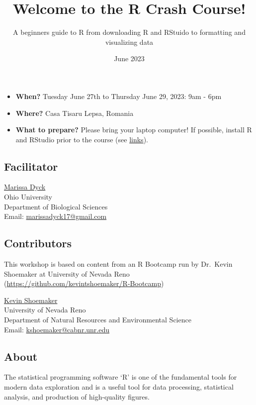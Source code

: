 \documentclass[
]{article}
\title{Welcome to the R Crash Course!}
\author{A beginners guide to R from downloading R and RStuido to
formatting and visualizing data}
\date{June 2023}
\providecommand{\tightlist}{%
  \setlength{\itemsep}{0pt}\setlength{\parskip}{0pt}}
\begin{document}
\maketitle

\begin{itemize}
\tightlist
\item
  \textbf{When?} Tuesday June 27th to Thursday June 29, 2023: 9am - 6pm
\item
  \textbf{Where?} Casa Tisaru Lepsa, Romania
\item
  \textbf{What to prepare?} Please bring your laptop computer! If
  possible, install R and RStudio prior to the course (see
  \href{Links.html}{links}).
\end{itemize}

\hypertarget{facilitator}{%
\subsection{Facilitator}\label{facilitator}}

\href{https://github.com/marissadyck}{Marissa Dyck}\\
Ohio University\\
Department of Biological Sciences\\
Email: \url{marissadyck17@gmail.com}

\hypertarget{contributors}{%
\subsection{Contributors}\label{contributors}}

This workshop is based on content from an R Bootcamp run by Dr.~Kevin
Shoemaker at University of Nevada Reno
(\url{https://github.com/kevintshoemaker/R-Bootcamp})

\href{http://naes.unr.edu/shoemaker/}{Kevin Shoemaker}\\
University of Nevada Reno\\
Department of Natural Resources and Environmental Science\\
Email: \url{kshoemaker@cabnr.unr.edu}

\hypertarget{about}{%
\subsection{About}\label{about}}

The statistical programming software `R' is one of the fundamental tools
for modern data exploration and is a useful tool for data processing,
statistical analysis, and production of high-quality figures.
\end{document}
